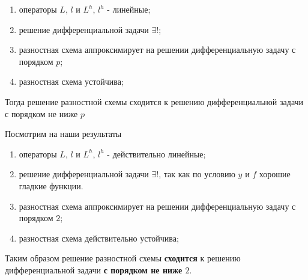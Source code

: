 \begin{task}
\begin{enumerate}[I.]
\begin{theorem}[Филиппов А.Ф.]
            \begin{enumerate}
              \item операторы $L$, $l$ и $L^h$, $l^h$ - линейные;
              \item решение дифференциальной задачи $\exists!$;
              \item разностная схема аппроксимирует на решении дифференциальную задачу с порядком $p$;
              \item разностная схема устойчива;
            \end{enumerate}
            Тогда решение разностной схемы сходится к решению дифференциальной задачи с порядком не ниже $p$
          \end{theorem}
          Посмотрим на наши результаты
          \begin{enumerate}
            \item операторы $L$, $l$ и $L^h$, $l^h$ - действительно линейные;
            \item решение дифференциальной задачи $\exists!$, так как по условию $y$ и $f$ хорошие гладкие функции.
            \item разностная схема аппроксимирует на решении дифференциальную задачу с порядком $2$;
            \item разностная схема действительно устойчива;
          \end{enumerate}
          Таким образом решение разностной схемы \textbf{сходится} к решению дифференциальной задачи \textbf{с порядком не ниже $2$}.
  \end{enumerate}
\end{task}
